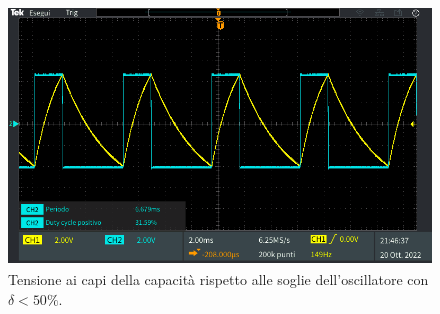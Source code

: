 \documentclass{report}
\begin{document}
\begin{figure}[h!]
	\centering
	\includegraphics[height=6.9cm]{immagini/TEK00036}
	\caption{Tensione ai capi della capacità rispetto alle soglie dell'oscillatore con $\delta<50\%$.}
	\label{figura:oscillo4_2_soglie}
\end{figure}

\end{document}
